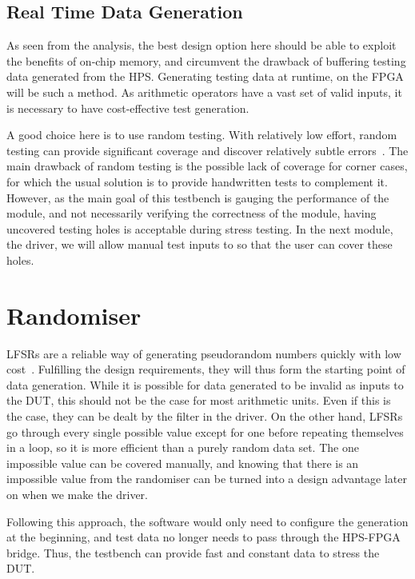 \subsection{Real Time Data Generation}
As seen from the analysis, the best design option here should be able to exploit the benefits of on-chip memory, and circumvent the drawback of buffering testing data generated from the HPS.
Generating testing data at runtime, on the FPGA will be such a method.
As arithmetic operators have a vast set of valid inputs, it is necessary to have cost-effective test generation.

A good choice here is to use random testing.
With relatively low effort, random testing can provide significant coverage and discover relatively subtle errors~\cite{Duran1}.
The main drawback of random testing is the possible lack of coverage for corner cases, for which the usual solution is to provide handwritten tests to complement it.
However, as the main goal of this testbench is gauging the performance of the module, and not necessarily verifying the correctness of the module, having uncovered testing holes is acceptable during stress testing.
In the next module, the driver, we will allow manual test inputs to so that the user can cover these holes.

\section{Randomiser}

LFSRs are a reliable way of generating pseudorandom numbers quickly with low cost~\cite{Hazwani1}.
Fulfilling the design requirements, they will thus form the starting point of data generation.
While it is possible for data generated to be invalid as inputs to the DUT, this should not be the case for most arithmetic units.
Even if this is the case, they can be dealt by the filter in the driver.
On the other hand, LFSRs go through every single possible value except for one before repeating themselves in a loop, so it is more efficient than a purely random data set.
The one impossible value can be covered manually, and knowing that there is an impossible value from the randomiser can be turned into a design advantage later on when we make the driver.

Following this approach, the software would only need to configure the generation at the beginning, and test data no longer needs to pass through the HPS-FPGA bridge.
Thus, the testbench can provide fast and constant data to stress the DUT.

